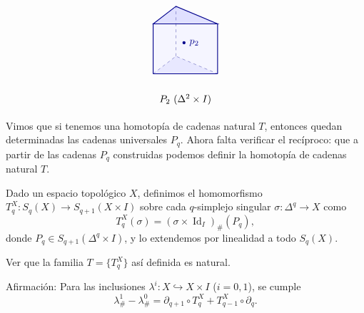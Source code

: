 \begin{dem}
\begin{ejemplo}
\[\begin{tikzpicture}[baseline=(current bounding box.center), scale=0.95]
    \coordinate (A0) at (8.30, 0.00);
    \coordinate (A1) at (10.70, 0.00);
    \coordinate (A2) at (9.15, 0.65);
    \coordinate (B0) at (8.30, 1.85);
    \coordinate (B1) at (10.70, 1.85);
    \coordinate (B2) at (9.15, 2.50);
    \coordinate (P2) at (9.45, 1.15);

    \fill[blue!4]  (A0) -- (A1) -- (B1) -- (B0) -- cycle;
    \fill[blue!9]  (A0) -- (A1) -- (A2) -- cycle;
    \fill[blue!12] (B0) -- (B1) -- (B2) -- cycle;

    \draw[dashed, blue!55!black!65] (A0) -- (A2) -- (A1);
    \draw[dashed, blue!55!black!65] (A2) -- (B2);

    \draw[thick, blue!55!black] (A0) -- (A1);
    \draw[thick, blue!55!black] (A0) -- (B0) (A1) -- (B1);
    \draw[thick, blue!55!black] (B0) -- (B1) -- (B2) -- cycle;

    \fill[blue!55!black] (P2) circle (1.6pt) node[right=2pt] {$p_2$};

    \node at (9.50, -0.95) {$P_2$ ($\Delta^2 \times I$)};
\end{tikzpicture}
\]
\end{ejemplo}

Vimos que si tenemos una homotopía de cadenas natural $T$, entonces quedan determinadas las cadenas universales $P_q$. Ahora falta verificar el recíproco: que a partir de las cadenas $P_q$ construidas podemos definir la homotopía de cadenas natural $T$.

\begin{definicion}
Dado un espacio topológico $X$, definimos el homomorfismo $T_q^X \colon S_q(X) \to S_{q+1}(X \times I)$ sobre cada $q$-simplejo singular $\sigma \colon \Delta^q \to X$ como
\[
T_q^X(\sigma) = (\sigma \times \operatorname{Id}_I)_\#(P_q),
\]
donde $P_q \in S_{q+1}(\Delta^q \times I)$, y lo extendemos por linealidad a todo $S_q(X)$.
\end{definicion}

\begin{ejercicio}
Ver que la familia $T = \{T_q^X\}$ así definida es natural.
\end{ejercicio}

{Afirmación:} Para las inclusiones $\lambda^i \colon X \hookrightarrow X \times I$ ($i = 0, 1$), se cumple
\[
\lambda^1_\# - \lambda^0_\# = \partial_{q+1} \circ T_q^X + T_{q-1}^X \circ \partial_q.
\]


\end{dem}
